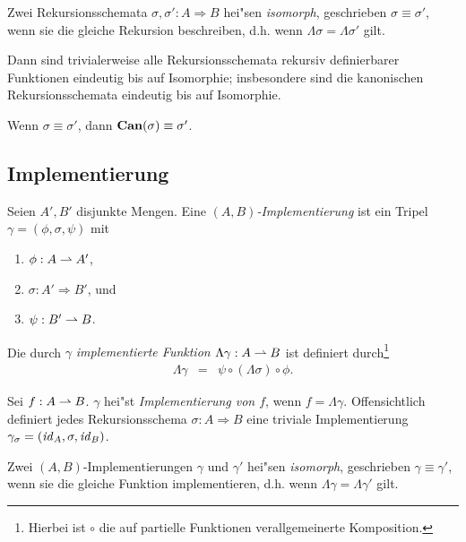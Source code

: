 \documentclass[12pt,a4paper]{article}
\begin{document}
\begin{definition}
  Zwei Rekursionsschemata $\sigma,\sigma':A \Rightarrow B$ hei"sen \emph{isomorph},
  geschrieben $\sigma \equiv \sigma'$, wenn sie die gleiche Rekursion beschreiben,
  d.h. wenn $\Lambda \sigma = \Lambda \sigma'$ gilt.
\end{definition}
Dann sind trivialerweise alle Rekursionsschemata rekursiv definierbarer Funktionen eindeutig
bis auf Isomorphie; insbesondere sind die kanonischen Rekursionsschemata eindeutig bis auf
Isomorphie.

\begin{corollary}
  Wenn $\sigma \equiv \sigma'$, dann $\mathbf{Can}(\sigma) \equiv \sigma'$.
\end{corollary}


\subsection{Implementierung}

\begin{definition}[Implementierung]
  Seien $A',B'$ disjunkte Mengen. Eine \emph{$(A,B)$-Implementierung} ist ein Tripel
  $\gamma = (\phi,\sigma,\psi)$ mit
  \begin{enumerate}
  \item $\phi:A \rightharpoonup A'$,
  \item $\sigma: A' \Rightarrow B'$, und
  \item $\psi:B' \rightharpoonup B$.
  \end{enumerate}
  Die durch $\gamma$ \emph{implementierte Funktion $\Lambda\gamma: A \rightharpoonup B$} ist definiert
  durch\footnote{Hierbei ist $\circ$ die auf partielle Funktionen verallgemeinerte Komposition.}
  \[\begin{array}{rcl}
    \Lambda \gamma &=& \psi \circ (\Lambda \sigma) \circ \phi.
  \end{array}\]
\end{definition}
Sei $f: A \rightharpoonup B$. $\gamma$ hei"st \emph{Implementierung von $f$}, wenn $f = \Lambda \gamma$.
Offensichtlich definiert jedes Rekursionsschema $\sigma:A \Rightarrow B$ eine triviale
Implementierung $\gamma_\sigma = (\mathit{id}_A,\sigma,\mathit{id}_B)$.

\begin{definition}
  Zwei $(A,B)$-Implementierungen $\gamma$ und $\gamma'$ hei"sen \emph{isomorph}, geschrieben
  $\gamma \equiv \gamma'$, wenn sie die gleiche Funktion implementieren, d.h. wenn
  $\Lambda \gamma = \Lambda \gamma'$ gilt.
\end{definition}
\end{document}
